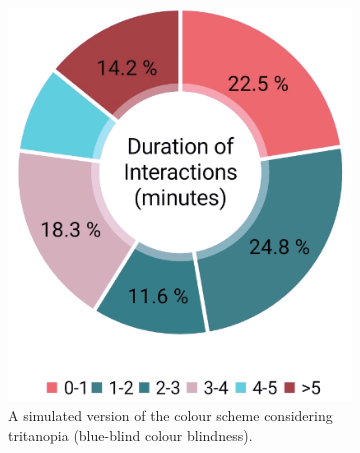 \documentclass{l4proj}
\begin{document}
\begin{figure}[!htb]
    \centering
    \begin{subfigure}[b]{0.3\textwidth}
        \includegraphics[width=\textwidth]{images/tritanopia.png}
        \caption{ A simulated version of the colour scheme considering tritanopia (blue-blind colour blindness). }
        \label{fig:tritanopia}
    \end{subfigure}
    ~
    \begin{subfigure}[b]{0.3\textwidth}

\end{subfigure}
\end{figure}
\end{document}
